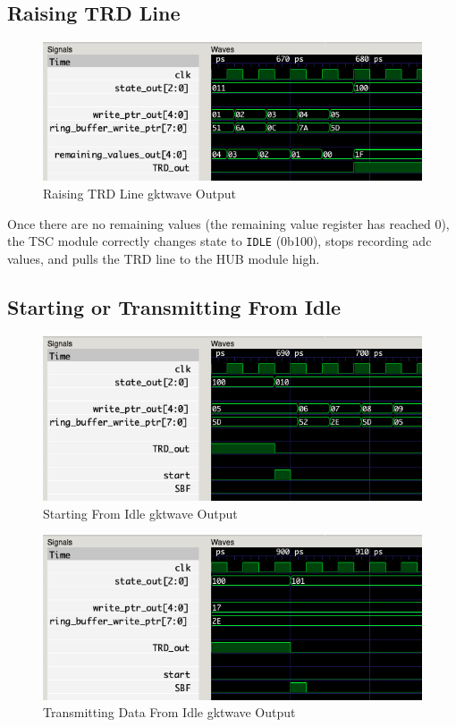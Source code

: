\subsection{Raising TRD Line}
\begin{figure}[H]
    \centering
    \includegraphics[width=\columnwidth]{Figures/E16captured}
    \caption{Raising TRD Line gktwave Output}
    \label{fig:testE}
\end{figure}

Once there are no remaining values (the remaining value register has reached 0), the TSC module correctly changes state to \texttt{IDLE} (0b100), stops recording adc values, and pulls the TRD line to the HUB module high.

\subsection{Starting or Transmitting From Idle}
\begin{figure}[H]
    \centering
    \includegraphics[width=\columnwidth]{Figures/Fidle_start}
    \caption{Starting From Idle gktwave Output}
    \label{fig:testF}
\end{figure}
\begin{figure}[H]
    \centering
    \includegraphics[width=\columnwidth]{Figures/Gidle_SBF}
    \caption{Transmitting Data From Idle gktwave Output}
    \label{fig:testG}
\end{figure}

